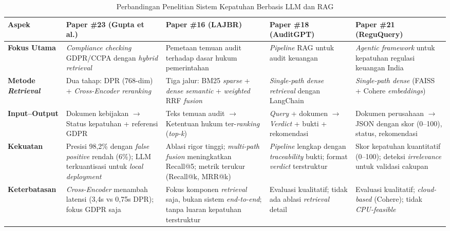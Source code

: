 \documentclass[bachelor,bahasa]{thesisdtetiugm}
\begin{document}
\begin{table}[htbp]
\centering
\caption{Perbandingan Penelitian Sistem Kepatuhan Berbasis LLM dan RAG}
\label{tab:llm-comparison}
\small
\begin{tabular}{|p{2cm}|p{3cm}|p{3cm}|p{3cm}|p{3cm}|}
\hline
\textbf{Aspek} & \textbf{Paper \#23 (Gupta et al.)} & \textbf{Paper \#16 (LAJBR)} & \textbf{Paper \#18 (AuditGPT)} & \textbf{Paper \#21 (ReguQuery)} \\
\hline
\textbf{Fokus Utama} & \textit{Compliance checking} GDPR/CCPA dengan \textit{hybrid retrieval} & Pemetaan temuan audit terhadap dasar hukum pemerintahan & \textit{Pipeline} RAG untuk audit keuangan & \textit{Agentic framework} untuk kepatuhan regulasi keuangan India \\
\hline
\textbf{Metode \textit{Retrieval}} & Dua tahap: DPR (768-dim) + \textit{Cross-Encoder reranking} & Tiga jalur: BM25 \textit{sparse} + \textit{dense semantic} + \textit{weighted} RRF \textit{fusion} & \textit{Single-path dense retrieval} dengan LangChain & \textit{Single-path dense} (FAISS + Cohere \textit{embeddings}) \\
\hline
\textbf{Input--Output} & Dokumen kebijakan $\rightarrow$ Status kepatuhan + referensi GDPR & Teks temuan audit $\rightarrow$ Ketentuan hukum ter-\textit{ranking} (\textit{top-k}) & \textit{Query} + dokumen $\rightarrow$ \textit{Verdict} + bukti + rekomendasi & Dokumen perusahaan $\rightarrow$ JSON dengan skor (0--100), status, rekomendasi \\
\hline
\textbf{Kekuatan} & Presisi 98,2\% dengan \textit{false positive} rendah (6\%); LLM terkuantisasi untuk \textit{local deployment} & Ablasi rigor tinggi; \textit{multi-path fusion} meningkatkan Recall@5; metrik terukur (Recall@k, MRR@k) & \textit{Pipeline} lengkap dengan \textit{traceability} bukti; format \textit{verdict} terstruktur & Skor kepatuhan kuantitatif (0--100); deteksi \textit{irrelevance} untuk validasi cakupan \\
\hline
\textbf{Keterbatasan} & \textit{Cross-Encoder} menambah latensi (3,4s vs 0,75s DPR); fokus GDPR saja & Fokus komponen \textit{retrieval} saja, bukan sistem \textit{end-to-end}; tanpa luaran kepatuhan terstruktur & Evaluasi kualitatif; tidak ada ablasi \textit{retrieval} detail & Evaluasi kualitatif; \textit{cloud-based} (Cohere); tidak \textit{CPU-feasible} \\
\hline
\end{tabular}
\end{table}
\end{document}

